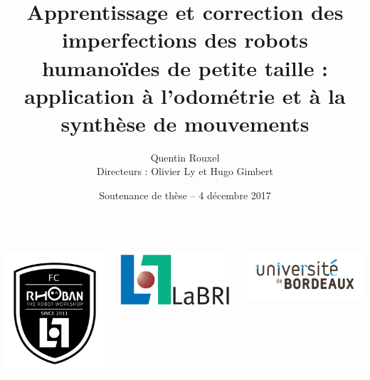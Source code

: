 \documentclass[10pt]{beamer}
\title[Correction défauts robots humanoïdes]{
Apprentissage et correction des imperfections 
des robots humanoïdes de petite taille :\\
application à l'odométrie et à la synthèse de mouvements
}
\author[Quentin Rouxel]{
Quentin Rouxel\\
\vspace{0.1cm}
\small
Directeurs : Olivier Ly et Hugo Gimbert
}
\institute[Rhoban]{Équipe Rhoban - LaBRI - Université de Bordeaux}
\date[4 décembre 2017 (Thèse)]{Soutenance de thèse -- 4 décembre 2017}
\begin{document}
\begin{frame}{}
    \begin{columns}
        \begin{column}{0.22\textwidth}
            \includegraphics[width=0.7\linewidth]{../media/rhoban_logo.png}
        \end{column}
        \begin{column}{0.22\textwidth}
            \includegraphics[width=\linewidth]{../media/logo_labri.jpg}
        \end{column}
        \begin{column}{0.22\textwidth}
            \includegraphics[width=\linewidth]{../template/logo_ubx.jpg}

\end{column}
\end{columns}
\end{frame}
\end{document}
